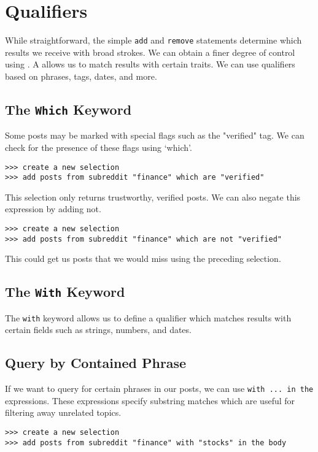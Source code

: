 \section{Qualifiers}
While straightforward, the simple \texttt{add} and \texttt{remove} statements determine which results we receive with broad strokes.
We can obtain a finer degree of control using . A  allows us to match results with certain traits.
We can use qualifiers based on phrases, tags, dates, and more.



\subsection{The \texttt{Which} Keyword}
Some posts may be marked with special flags such as the "verified" tag. We can check for the presence of these flags using ‘which’.


\begin{lstlisting}
>>> create a new selection
>>> add posts from subreddit "finance" which are "verified"
\end{lstlisting}

This selection only returns trustworthy, verified posts. We can also negate this expression by adding not.

\begin{lstlisting}
>>> create a new selection
>>> add posts from subreddit "finance" which are not "verified"
\end{lstlisting}

This could get us posts that we would miss using the preceding selection.



\subsection{The \texttt{With} Keyword}
The \texttt{with} keyword allows us to define a qualifier which matches results with certain fields such as strings, numbers, and dates.

\subsection{Query by Contained Phrase}
If we want to query for certain phrases in our posts, we can use \texttt{with ... in the} expressions. These expressions specify substring matches which are useful for filtering away unrelated topics.
\begin{lstlisting}
>>> create a new selection
>>> add posts from subreddit "finance" with "stocks" in the body
\end{lstlisting}

